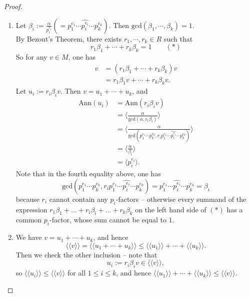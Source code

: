 \documentclass[11pt,openany]{book}
\theoremstyle{plain}
\theoremstyle{definition}
\theoremstyle{remark}
\begin{document}
\begin{proof}
    \begin{enumerate}
        \item Let $\beta_i:=\frac{\alpha}{p_i^{e_i}}(=p_1^{e_1}\cdots\widehat{p_i^{e_i}}\cdots p_k^{e_k})$. Then
        $\mathrm{gcd}(\beta_1,\cdots,\beta_k)=1$.\\
        By Bezout's Theorem, there exists $r_1,\cdots,r_k\in R$ such that $$r_1\beta_1+\cdots+r_k\beta_k=1 \quad \quad (\ast)$$
        So for any $v\in M$, one has
        \begin{align*}
            v&=(r_1\beta_1+\cdots+r_k\beta_k)v\\
            &=r_1\beta_1v+\cdots+r_k\beta_kv.
        \end{align*}
        Let $u_i:=r_i\beta_iv$. Then $v = u_1+\cdots+u_k$, and
        \begin{align*}
            \mathrm{Ann}(u_i)&=\mathrm{Ann}(r_i\beta_iv)\\
            &=\langle\frac{\alpha}{\mathrm{gcd}(\alpha , r_i\beta_i)}\rangle\\
            &=\langle\frac{\alpha}{\mathrm{gcd}(p_1^{e_1}\cdots p_k^{e_k} , r_ip_1^{e_1}\cdots\hat{p_i^{e_i}}\cdots p_k^{e_k})}\rangle\\
            &=\langle\frac{\alpha}{\beta_i}\rangle\\
            &=\langle p_i^{e_i}\rangle.
        \end{align*}
        Note that in the fourth equality above, one has $$\mathrm{gcd}(p_1^{e_1}\cdots p_k^{e_k} , r_ip_1^{e_1}\cdots\hat{p_i^{e_i}}\cdots p_k^{e_k}) = p_1^{e_1}\cdots\hat{p_i^{e_i}}\cdots p_k^{e_k} = \beta_i$$ because $r_i$ cannot contain any $p_i$-factors -- otherwise every summand of the expression $r_1\beta_1 + \dots + r_i\beta_i + \dots +r_k\beta_k$ on the left hand side of $(\ast)$ has a common $p_i$-factor, whose sum cannot be equal to $1$.
        
        \item We have $v = u_1+\cdots+u_k$, and hence
        $$\langle\langle v\rangle\rangle=\langle\langle u_1+\cdots+u_k\rangle\rangle\leq\langle\langle u_1\rangle\rangle+\cdots+\langle\langle u_k\rangle\rangle.$$
        Then we check the other inclusion -- note that 
        $$u_i := r_i\beta_iv \in \langle \langle v \rangle \rangle,$$
        so $\langle \langle u_i \rangle \rangle \leq \langle \langle v \rangle \rangle$ for all $1 \leq i \leq k$,
        and hence $\langle\langle u_1\rangle\rangle+\cdots+\langle\langle u_k\rangle\rangle \leq \langle\langle v\rangle\rangle.$
        \medskip
        

\end{enumerate}
\end{proof}
\end{document}
